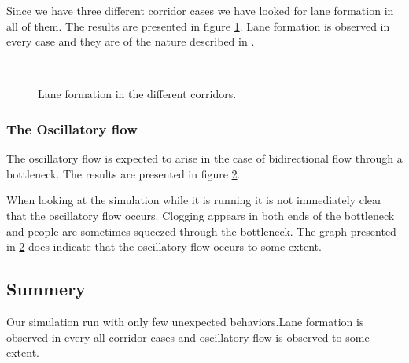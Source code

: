 Since we have three different corridor cases we have looked for lane
formation in all of them. The results are presented in figure
\ref{fig:laneformation}. Lane formation is observed in every case
and they are of the nature described in \cite{self-org}.\\

\begin{figure}[h]
\centering
\subfloat[]{\resizebox{8cm}{!}{}}
\subfloat[]{\resizebox{8cm}{!}{}}\\
\subfloat[]{\resizebox{8cm}{!}{}}
\caption{Lane formation in the different corridors.}
\label{fig:laneformation}
\end{figure}

\subsubsection{The Oscillatory flow}
The oscillatory flow is expected to arise in the case of bidirectional
flow through a bottleneck. The results are presented in figure
\ref{fig:oscillitoryflow}.\\

\begin{figure}[h]
\centering
{}
\caption{}
\label{fig:oscillitoryflow}
\end{figure}

When looking at the simulation while it is running it is not
immediately clear that the oscillatory flow occurs. Clogging
appears in both ends of the bottleneck and people are sometimes
squeezed through the bottleneck. The graph presented in
\ref{fig:oscillitoryflow} does indicate that the oscillatory
flow occurs to some extent.

\subsection{Summery}
Our simulation run with only few unexpected behaviors.Lane formation
is observed in every all corridor cases and oscillatory flow is
observed to some extent. 